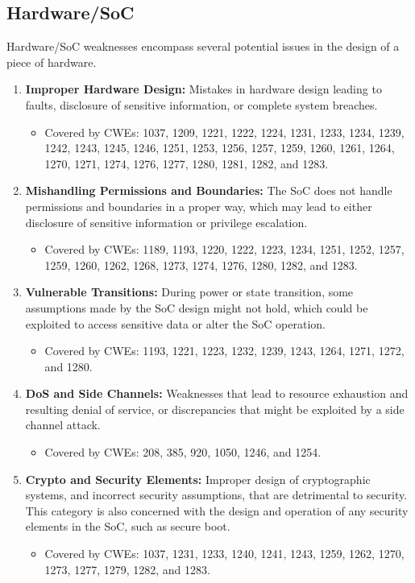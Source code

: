 \documentclass{article}
\begin{document}
\subsection{Hardware/SoC}
Hardware/SoC weaknesses encompass several potential issues in the design of a piece of hardware.
\begin{enumerate}
    \item \textbf{Improper Hardware Design:} Mistakes in hardware design leading to faults, disclosure of sensitive information, or complete system breaches. 
    \begin{itemize}
        \item Covered by CWEs: 1037, 1209, 1221, 1222, 1224, 1231, 1233, 1234, 1239, 1242, 1243, 1245, 1246, 1251, 1253, 1256, 1257, 1259, 1260, 1261, 1264, 1270, 1271, 1274, 1276, 1277, 1280, 1281, 1282, and 1283.
    \end{itemize}
    
    \item \textbf{Mishandling Permissions and Boundaries:} The SoC does not handle permissions and boundaries in a proper way, which may lead to either disclosure of sensitive information or privilege escalation.
    \begin{itemize}
        \item Covered by CWEs: 1189, 1193, 1220, 1222, 1223, 1234, 1251, 1252, 1257, 1259, 1260, 1262, 1268, 1273, 1274, 1276, 1280, 1282, and 1283. 
    \end{itemize}
    
    \item \textbf{Vulnerable Transitions:} During power or state transition, some assumptions made by the SoC design might not hold, which could be exploited to access sensitive data or alter the SoC operation.  
    \begin{itemize}
        \item Covered by CWEs: 1193, 1221, 1223, 1232, 1239, 1243, 1264, 1271, 1272, and 1280. 
    \end{itemize}
    
    \item \textbf{DoS and Side Channels:} Weaknesses that lead to resource exhaustion and resulting denial of service, or discrepancies that might be exploited by a side channel attack. 
    \begin{itemize}
        \item Covered by CWEs: 208, 385, 920, 1050, 1246, and 1254. 
    \end{itemize}
    
    \item \textbf{Crypto and Security Elements:} Improper design of cryptographic systems, and incorrect security assumptions, that are detrimental to security. This category is also concerned with the design and operation of any security elements in the SoC, such as secure boot.
    \begin{itemize}
        \item Covered by CWEs: 1037, 1231, 1233, 1240, 1241, 1243, 1259, 1262, 1270, 1273, 1277, 1279, 1282, and 1283. 
    \end{itemize}
\end{enumerate} 
\end{document}
